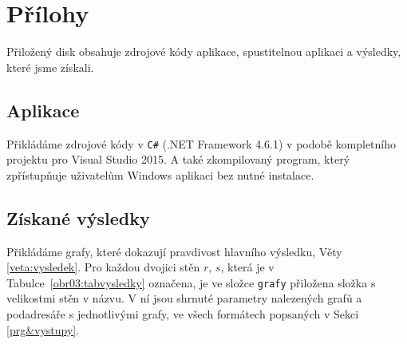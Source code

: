 \documentclass[12pt,a4paper]{report}
\let\openright=\clearpage
\begin{document}



\tableofcontents












\listoffigures



\appendix
\chapter{Přílohy}
Přiložený disk obsahuje zdrojové kódy aplikace, spustitelnou aplikaci a výsledky, které jsme získali.

\section{Aplikace}
Přikládáme zdrojové kódy v \texttt{C\#} (.NET Framework 4.6.1) v podobě kompletního projektu pro  Visual Studio 2015. A také zkompilovaný program, který zpřístupňuje uživatelům Windows aplikaci bez nutné instalace.
 
\section{Získané výsledky} \label{priloha:vysledky}
Přikládáme grafy, které dokazují pravdivost hlavního výsledku, Věty \ref{veta:vysledek}. Pro každou dvojici stěn $r$, $s$, která je v Tabulce~\ref{obr03:tabvysledky} označena, je ve složce \texttt{grafy} přiložena složka s velikostmi stěn v názvu. V ní jsou shrnuté parametry nalezených grafů a podadresáře s jednotlivými grafy, ve všech formátech popsaných v Sekci \ref{prg&vystupy}.
\openright
\end{document}
